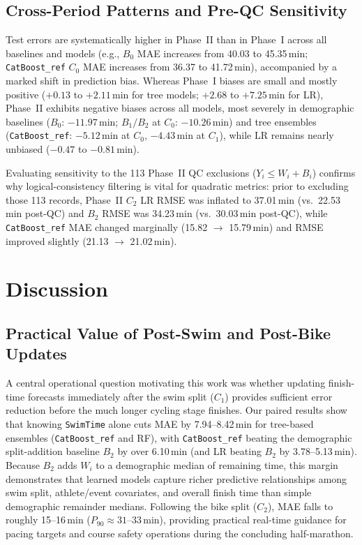 \documentclass[11pt,a4paper]{article}
\begin{document}
\subsection{Cross-Period Patterns and Pre-QC Sensitivity}

Test errors are systematically higher in Phase~II than in Phase~I
across all baselines and models (e.g., $B_0$ MAE increases from 40.03
to 45.35\,min; \texttt{CatBoost\_ref} $C_0$ MAE increases from 36.37
to 41.72\,min), accompanied by a marked shift in prediction bias.
Whereas Phase~I biases are small and mostly positive ($+0.13$ to
$+2.11$\,min for tree models; $+2.68$ to $+7.25$\,min for LR),
Phase~II exhibits negative biases across all models, most severely in
demographic baselines ($B_0$: $-11.97$\,min; $B_1/B_2$ at $C_0$:
$-10.26$\,min) and tree ensembles (\texttt{CatBoost\_ref}: $-5.12$\,min
at $C_0$, $-4.43$\,min at $C_1$), while LR remains nearly unbiased
($-0.47$ to $-0.81$\,min).

Evaluating sensitivity to the 113 Phase~II QC exclusions
($Y_i \le W_i + B_i$) confirms why logical-consistency filtering is
vital for quadratic metrics: prior to excluding those 113 records,
Phase~II $C_2$ LR RMSE was inflated to 37.01\,min (vs.\ 22.53\,min
post-QC) and $B_2$ RMSE was 34.23\,min (vs.\ 30.03\,min post-QC),
while \texttt{CatBoost\_ref} MAE changed marginally (15.82 $\to$
15.79\,min) and RMSE improved slightly (21.13 $\to$ 21.02\,min).

\section{Discussion}

\subsection{Practical Value of Post-Swim and Post-Bike Updates}

A central operational question motivating this work was whether
updating finish-time forecasts immediately after the swim split ($C_1$)
provides sufficient error reduction before the much longer cycling
stage finishes. Our paired results show that knowing \texttt{SwimTime}
alone cuts MAE by 7.94--8.42\,min for tree-based ensembles
(\texttt{CatBoost\_ref} and RF), with \texttt{CatBoost\_ref} beating
the demographic split-addition baseline $B_2$ by over 6.10\,min (and LR
beating $B_2$ by 3.78--5.13\,min). Because $B_2$ adds $W_i$ to a
demographic median of remaining time, this margin demonstrates that
learned models capture richer predictive relationships among swim
split, athlete/event covariates, and overall finish time than simple
demographic remainder medians. Following the bike split ($C_2$),
MAE falls to roughly 15--16\,min ($P_{90} \approx 31$--33\,min),
providing practical real-time guidance for pacing targets and course
safety operations during the concluding half-marathon.
\end{document}
